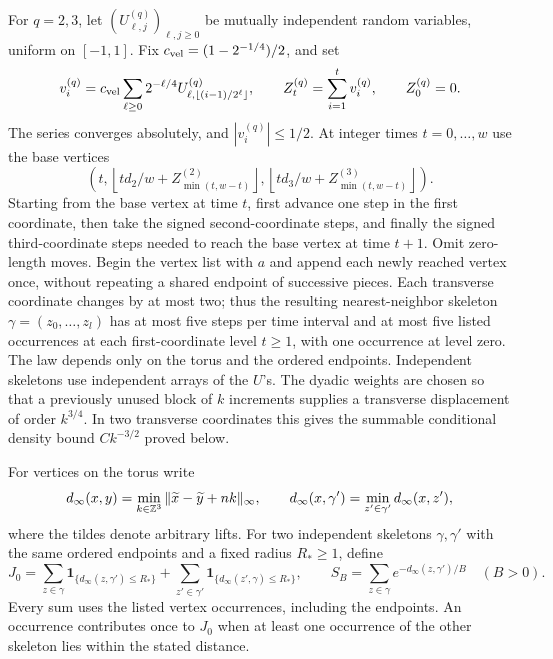 For $q=2,3$, let
$(U^{(q)}_{\ell,j})_{\ell,j\ge0}$ be mutually independent random
variables, uniform on $[-1,1]$. Fix
$c_{\rm vel}=(1-2^{-1/4})/2$, and set
\[
 v_i^{(q)}=c_{\rm vel}\sum_{\ell\ge0}2^{-\ell/4}
          U^{(q)}_{\ell,\lfloor(i-1)/2^\ell\rfloor},
 \qquad Z_t^{(q)}=\sum_{i=1}^t v_i^{(q)},\qquad Z_0^{(q)}=0.
\]
The series converges absolutely, and $|v_i^{(q)}|\le1/2$.
At integer times $t=0,\ldots,w$ use the base vertices
\[
 \left(t,\left\lfloor td_2/w+Z^{(2)}_{\min(t,w-t)}\right\rfloor,
          \left\lfloor td_3/w+Z^{(3)}_{\min(t,w-t)}\right\rfloor\right).
\]
Starting from the base vertex at time $t$, first advance one step in
the first coordinate, then take the signed second-coordinate steps,
and finally the signed third-coordinate steps needed to reach the
base vertex at time $t+1$. Omit zero-length moves. Begin the vertex
list with $a$ and append each newly reached vertex once, without
repeating a shared endpoint of successive pieces. Each transverse
coordinate changes by at most two; thus the resulting
nearest-neighbor skeleton $\gamma=(z_0,\ldots,z_l)$ has at most five
steps per time interval and at most five listed occurrences at each
first-coordinate level $t\ge1$, with one occurrence at level zero.
The law depends only on the torus and the ordered endpoints.
Independent skeletons use independent arrays of the $U$'s.
The dyadic weights are chosen so that a previously unused block of
$k$ increments supplies a transverse displacement of order $k^{3/4}$.
In two transverse coordinates this gives the summable conditional
density bound $Ck^{-3/2}$ proved below.

For vertices on the torus write
\[
 d_\infty(x,y)=\min_{k\in\mathbb Z^3}\|\widetilde x-\widetilde y+nk\|_\infty,
 \qquad d_\infty(x,\gamma')=\min_{z'\in\gamma'}d_\infty(x,z'),
\]
where the tildes denote arbitrary lifts. For two independent skeletons
$\gamma,\gamma'$ with the same ordered endpoints and a fixed radius
$R_*\ge1$, define
\[
 J_0=\sum_{z\in\gamma}\mathbf1_{\{d_\infty(z,\gamma')\le R_*\}}
       +\sum_{z'\in\gamma'}\mathbf1_{\{d_\infty(z',\gamma)\le R_*\}},
 \qquad
 S_B=\sum_{z\in\gamma}e^{-d_\infty(z,\gamma')/B}\quad(B>0).
\]
Every sum uses the listed vertex occurrences, including the endpoints.
An occurrence contributes once to $J_0$ when at least one occurrence
of the other skeleton lies within the stated distance.

